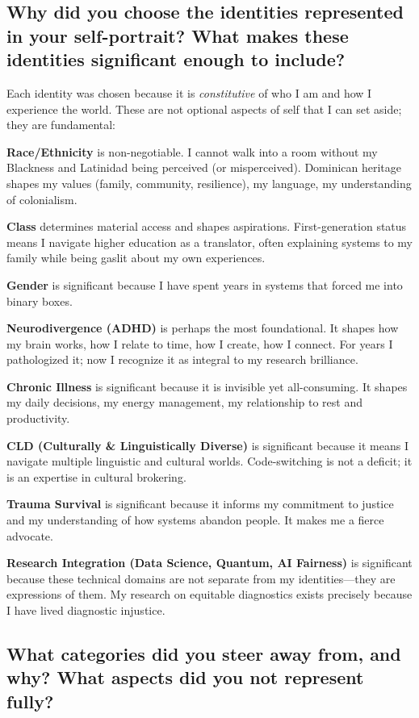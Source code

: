 \documentclass[10pt]{article}
\begin{document}
\subsection*{Why did you choose the identities represented in your self-portrait? What makes these identities significant enough to include?}

Each identity was chosen because it is \textit{constitutive} of who I am and how I experience the world. These are not optional aspects of self that I can set aside; they are fundamental:

\textbf{Race/Ethnicity} is non-negotiable. I cannot walk into a room without my Blackness and Latinidad being perceived (or misperceived). Dominican heritage shapes my values (family, community, resilience), my language, my understanding of colonialism.

\textbf{Class} determines material access and shapes aspirations. First-generation status means I navigate higher education as a translator, often explaining systems to my family while being gaslit about my own experiences.

\textbf{Gender} is significant because I have spent years in systems that forced me into binary boxes.

\textbf{Neurodivergence (ADHD)} is perhaps the most foundational. It shapes how my brain works, how I relate to time, how I create, how I connect. For years I pathologized it; now I recognize it as integral to my research brilliance.

\textbf{Chronic Illness} is significant because it is invisible yet all-consuming. It shapes my daily decisions, my energy management, my relationship to rest and productivity.

\textbf{CLD (Culturally \& Linguistically Diverse)} is significant because it means I navigate multiple linguistic and cultural worlds. Code-switching is not a deficit; it is an expertise in cultural brokering.

\textbf{Trauma Survival} is significant because it informs my commitment to justice and my understanding of how systems abandon people. It makes me a fierce advocate.

\textbf{Research Integration (Data Science, Quantum, AI Fairness)} is significant because these technical domains are not separate from my identities---they are expressions of them. My research on equitable diagnostics exists precisely because I have lived diagnostic injustice.

\subsection*{What categories did you steer away from, and why? What aspects did you not represent fully?}
\end{document}
